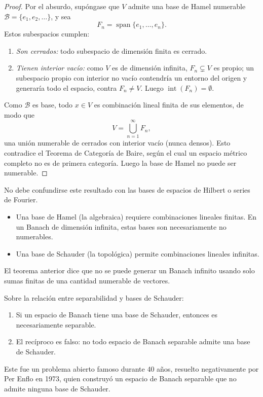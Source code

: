 \documentclass[11pt, a4paper]{article}
\begin{document}
\begin{proof}
Por el absurdo, supóngase que $V$ admite una base de Hamel numerable $\mathcal{B} = \{e_1, e_2, \dots\}$, y sea
\[
F_n = \operatorname{span}\{e_1, \dots, e_n\}.
\]
Estos subespacios cumplen:
\begin{enumerate}
    \item \textit{Son cerrados:} todo subespacio de dimensión finita es cerrado.
    \item \textit{Tienen interior vacío:} como $V$ es de dimensión infinita, $F_n \subsetneq V$ es propio; un subespacio propio con interior no vacío contendría un entorno del origen y generaría todo el espacio, contra $F_n \neq V$. Luego $\operatorname{int}(F_n) = \emptyset$.
\end{enumerate}
Como $\mathcal{B}$ es base, todo $x \in V$ es combinación lineal finita de sus elementos, de modo que
\[
V = \bigcup_{n=1}^{\infty} F_n,
\]
una unión numerable de cerrados con interior vacío (nunca densos). Esto contradice el Teorema de Categoría de Baire, según el cual un espacio métrico completo no es de primera categoría. Luego la base de Hamel no puede ser numerable.
\end{proof}

\obs No debe confundirse este resultado con las bases de espacios de Hilbert o series de Fourier.
\begin{itemize}
    \item Una base de Hamel (la algebraica) requiere combinaciones lineales finitas. En un Banach de dimensión infinita, estas bases son necesariamente no numerables.
    \item Una base de Schauder (la topológica) permite combinaciones lineales infinitas.
\end{itemize}
El teorema anterior dice que no se puede generar un Banach infinito usando solo sumas finitas de una cantidad numerable de vectores.

\obs Sobre la relación entre separabilidad y bases de Schauder:
\begin{enumerate}
    \item Si un espacio de Banach tiene una base de Schauder, entonces es necesariamente separable.
    \item El recíproco es falso: no todo espacio de Banach separable admite una base de Schauder.
\end{enumerate}
Este fue un problema abierto famoso durante 40 años, resuelto negativamente por Per Enflo en 1973, quien construyó un espacio de Banach separable que no admite ninguna base de Schauder.
\end{document}
